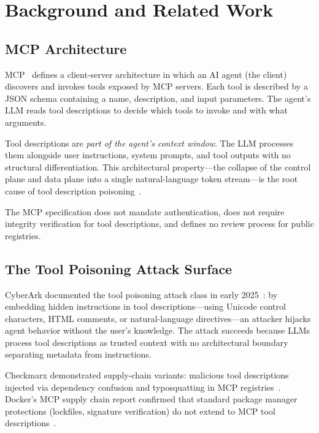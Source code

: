 \documentclass[letterpaper,twocolumn,10pt]{article}
\begin{document}
\section{Background and Related Work}
\label{sec:background}

\subsection{MCP Architecture}

MCP~\cite{mcp2024,mcpspec} defines a client-server architecture in which
an AI agent (the client) discovers and invokes tools exposed by MCP
servers.  Each tool is described by a JSON schema containing a name,
description, and input parameters.  The agent's LLM reads tool
descriptions to decide which tools to invoke and with what arguments.

Tool descriptions are \emph{part of the agent's context window}.  The
LLM processes them alongside user instructions, system prompts, and tool
outputs with no structural differentiation.  This architectural
property---the collapse of the control plane and data plane into a single
natural-language token stream---is the root cause of tool description
poisoning~\cite{greshake2023,cyberark2025}.

The MCP specification does not mandate authentication, does not require
integrity verification for tool descriptions, and defines no review
process for public registries.

\subsection{The Tool Poisoning Attack Surface}

CyberArk documented the tool poisoning attack class in early
2025~\cite{cyberark2025}: by embedding hidden instructions in tool
descriptions---using Unicode control characters, HTML comments, or
natural-language directives---an attacker hijacks agent behavior without
the user's knowledge.  The attack succeeds because LLMs process tool
descriptions as trusted context with no architectural boundary separating
metadata from instructions.

Checkmarx demonstrated supply-chain variants: malicious tool descriptions
injected via dependency confusion and typosquatting in MCP
registries~\cite{checkmarx2026}.  Docker's MCP supply chain report
confirmed that standard package manager protections (lockfiles, signature
verification) do not extend to MCP tool descriptions~\cite{docker2026}.
\end{document}
